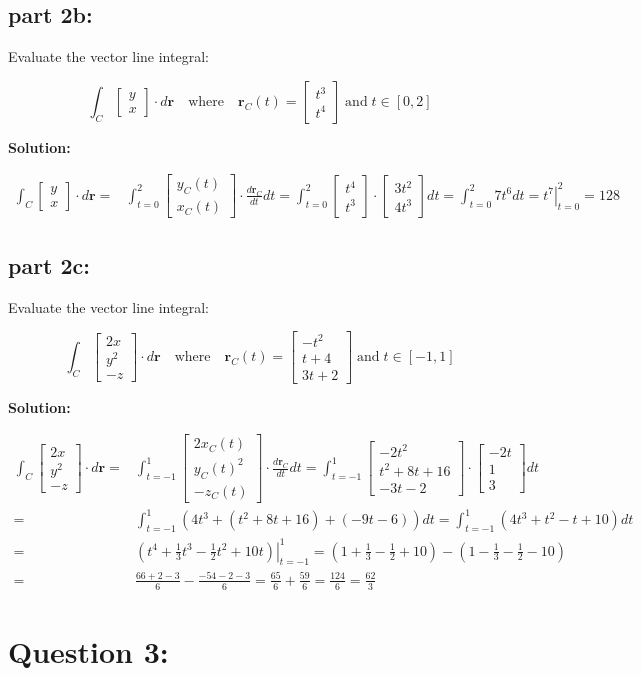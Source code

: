 \documentclass{article}
\newcommand{\colxyvec}[2]{\begin{bmatrix} #1 \\ #2 \end{bmatrix}}
\newcommand{\colvec}[3]{\begin{bmatrix} #1 \\ #2 \\ #3 \end{bmatrix}}
\newcommand{\at}[1]{\left. #1 \right|}
\newcommand{\dr}[1]{\textcolor{dark_red}{#1}}
\begin{document}
\subsection*{part 2b:}

Evaluate the vector line integral: 

\[\int_C \colxyvec{y}{x} \cdot d\mathbf{r} \quad\text{where}\quad \mathbf{r}_C(t) = \colxyvec{t^3}{t^4} \;\text{and}\; t \in [0,2]\]

\vspace{5mm}
\dr{\textbf{Solution:}}

\dr{\begin{align*}
\int_C \colxyvec{y}{x} \cdot d\mathbf{r} = & \int_{t=0}^2 \colxyvec{y_C(t)}{x_C(t)} \cdot \frac{d\mathbf{r}_C}{dt}dt 
= \int_{t=0}^2 \colxyvec{t^4}{t^3} \cdot \colxyvec{3t^2}{4t^3}dt 
= \int_{t=0}^2 7t^6 dt 
= \at{t^7}_{t=0}^2 
= 128
\end{align*}}




\subsection*{part 2c:}

Evaluate the vector line integral: 

\[\int_C \colvec{2x}{y^2}{-z} \cdot d\mathbf{r} \quad\text{where}\quad \mathbf{r}_C(t) = \colvec{-t^2}{t+4}{3t+2} \;\text{and}\; t \in [-1,1]\]

\vspace{5mm}
\dr{\textbf{Solution:}}

\dr{\begin{align*}
\int_C \colvec{2x}{y^2}{-z} \cdot d\mathbf{r} = & \int_{t=-1}^1 \colvec{2x_C(t)}{y_C(t)^2}{-z_C(t)} \cdot \frac{d\mathbf{r}_C}{dt}dt 
= \int_{t=-1}^1 \colvec{-2t^2}{t^2 + 8t + 16}{-3t - 2} \cdot \colvec{-2t}{1}{3}dt \\
= & \int_{t=-1}^1 (4t^3 + (t^2 + 8t + 16) + (-9t - 6))dt 
= \int_{t=-1}^1 (4t^3 + t^2 - t + 10)dt \\
= & \at{(t^4 + \frac{1}{3}t^3 - \frac{1}{2}t^2 + 10t)}_{t=-1}^1 
= (1 + \frac{1}{3} - \frac{1}{2} + 10) - (1 - \frac{1}{3} - \frac{1}{2} - 10) \\
= & \frac{66 + 2 - 3}{6} - \frac{-54 - 2 - 3}{6} 
= \frac{65}{6} + \frac{59}{6} 
= \frac{124}{6} 
= \frac{62}{3}
\end{align*}}




\section*{Question 3:}
\end{document}
